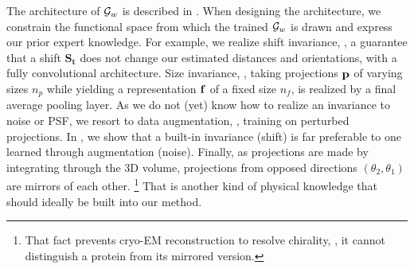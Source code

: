 The architecture of $\mathcal{G}_w$ is described in .
When designing the architecture, we constrain the functional space from which the trained $\mathcal{G}_w$ is drawn and express our prior expert knowledge.
For example, we realize shift invariance, \ie, a guarantee that a shift $\mathbf{S_t}$ does not change our estimated distances and orientations, with a fully convolutional architecture.
Size invariance, \ie, taking projections $\mathbf{p}$ of varying sizes $n_p$ while yielding a representation $\mathbf{f}$ of a fixed size $n_f$, is realized by a final average pooling layer.
As we do not (yet) know how to realize an invariance to noise or PSF, we resort to data augmentation, \ie, training on perturbed projections.
In , we show that a built-in invariance (shift) is far preferable to one learned through augmentation (noise).
Finally, as projections are made by integrating through the 3D volume, projections from opposed directions $(\theta_2,\theta_1)$ are mirrors of each other.%
\footnote{That fact prevents cryo-EM reconstruction to resolve chirality, \ie, it cannot distinguish a protein from its mirrored version.}
That is another kind of physical knowledge that should ideally be built into our method.

